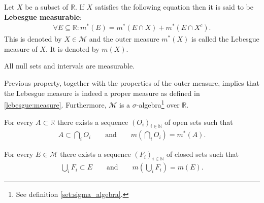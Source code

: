     \begin{theorem}\label{lebesgue:lebesgue_measure}
        Let $X$ be a subset of $\mathbb{R}$. If $X$ satisfies the following equation then it is said to be \textbf{Lebesgue measurable}:
        \begin{gather}
            \forall E\subseteq\mathbb{R}:m^*(E) = m^*(E\cap X) + m^*(E\cap X^c).
        \end{gather}
        This is denoted by $X\in\mathcal{M}$ and the outer measure $m^*(X)$ is called the Lebesgue measure of $X$. It is denoted by $m(X)$.
    \end{theorem}
    \begin{property}
        All null sets and intervals are measurable.
    \end{property}
    \begin{remark}
       Previous property, together with the properties of the outer measure, implies that the Lebesgue measure is indeed a proper measure as defined in \ref{lebesgue:measure}. Furthermore, $\mathcal{M}$ is a $\sigma$-algebra\footnote{See definition \ref{set:sigma_algebra}.} over $\mathbb{R}$.
    \end{remark}

    \begin{property}
        For every $A\subset\mathbb{R}$ there exists a sequence $(O_i)_{i\in\mathbb{N}}$ of open sets such that
        \begin{gather}
            \label{lebesgue:theorem:open_cover_existence}
            A\subset\bigcap_iO_i\qquad\text{and}\qquad m\left(\bigcap_iO_i\right) = m^*(A).
        \end{gather}
    \end{property}
    \begin{property}
        For every $E\in\mathcal{M}$ there exists a sequence $(F_i)_{i\in\mathbb{N}}$ of closed sets such that
        \begin{gather}
            \label{lebesgue:theorem:closed_cover_existence}
            \bigcup_iF_i\subset E\qquad\text{and}\qquad m\left(\bigcup_iF_i\right) = m(E).
        \end{gather}
    \end{property}

